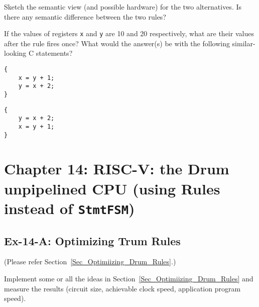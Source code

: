 Sketch the semantic view (and possible hardware) for the two
alternatives.  Is there any semantic difference between the two rules?

If the values of registers \verb|x| and \verb|y| are 10 and 20
respectively, what are their values after the rule fires once?  What
would the answer(s) be with the following similar-looking C
statements?

\begin{center}
\begin{minipage}{0.4\textwidth}
 {\footnotesize
 \begin{Verbatim}[frame=single, label=C/C++]
{
    x = y + 1;
    y = x + 2;
}
 \end{Verbatim}
 }
\end{minipage}
\hmm
\begin{minipage}{0.4\textwidth}
 {\footnotesize
 \begin{Verbatim}[frame=single, label=C/C++]
{
    y = x + 2;
    x = y + 1;
}
 \end{Verbatim}
 }
\end{minipage}
\end{center}


\hdivider

\section*{Chapter 14: RISC-V: the Drum unpipelined CPU (using Rules instead of {\tt StmtFSM})}


\subsection*{Ex-14-A: Optimizing Trum Rules}
\label{Ex-14-A-Optimizing-Drum-Rules}

(Please refer Section~\ref{Sec_Optimiizing_Drum_Rules}.)

Implement some or all the ideas in
Section~\ref{Sec_Optimiizing_Drum_Rules} and measure the results
(circuit size, achievable clock speed, application program speed).



\hdivider

